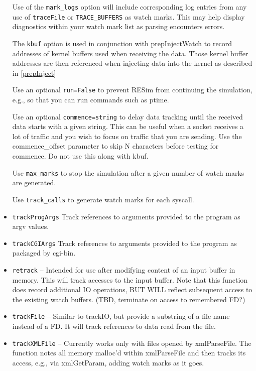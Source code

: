 \documentclass[titlepage]{article}
\begin{document}
\begin{itemize}
Use of the {\tt mark\_logs} option will include corresponding log entries from any use of {\tt traceFile} or {\tt TRACE\_BUFFERS} as watch marks.  This may help display diagnostics
within your watch mark list as parsing encounters errors.

The {\tt kbuf} option is used in conjunction with prepInjectWatch to record addresses of kernel buffers used when receiving the data.  Those kernel buffer addresses
are then referenced when injecting data into the kernel as described in \ref{prepInject}

Use an optional {\tt run=False} to prevent RESim from continuing the simulation, e.g., so that you can run commands such as ptime.

Use an optional {\tt commence=string} to delay data tracking until the received data starts with a given string.  This can be useful when a socket receives a lot of traffic and you
wish to focus on traffic that you are sending.  Use the commence\_offset parameter to skip N characters before testing for commence.  Do not use this along with kbuf.

Use {\tt max\_marks} to stop the simulation after a given number of watch marks are generated.

Use {\tt track\_calls} to generate watch marks for each syscall.

\item {\tt trackProgArgs} Track references to arguments provided to the program as argv values.

\item {\tt trackCGIArgs} Track references to arguments provided to the program as packaged by cgi-bin.

\item {\tt retrack} -- Intended for use after modifying content of an input buffer in memory.  This will track accesses to the input buffer.
Note that this function does record additional IO operations, BUT WILL reflect subsequent access to the existing watch buffers.  (TBD, terminate on access
to remembered FD?)

\item {\tt trackFile} -- Similar to trackIO, but provide a substring of a file name instead of a FD.  It will track references to data read from the file.
\item {\tt trackXMLFile} -- Currently works only with files opened by xmlParseFile. The function notes all memory malloc'd within
xmlParseFile and then tracks its access, e.g., via xmlGetParam, adding watch marks as it goes.


\end{itemize}
\end{document}
